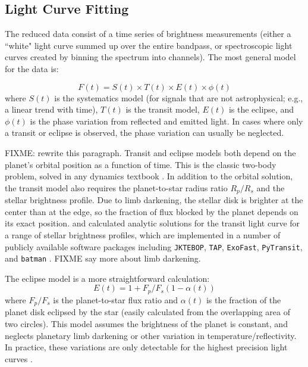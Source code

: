 \documentclass[graybox,natbib,nosecnum]{svmult}
\begin{document}
\subsection{Light Curve Fitting}
The reduced data consist of a time series of brightness measurements (either a ``white" light curve summed up over the entire bandpass, or spectroscopic light curves created by binning the spectrum into channels).  The most general model for the data is:

\begin{equation}
F(t) = S(t) \times T(t) \times E(t) \times \phi(t)
\end{equation}
where $S(t)$ is the systematics model (for signals that are not astrophysical; e.g., a linear trend with time), $T(t)$ is the transit model, $E(t)$ is the eclipse, and $\phi(t)$ is the phase variation from reflected and emitted light. In cases where only a transit or eclipse is observed, the phase variation can usually be neglected.

FIXME: rewrite this paragraph. Transit and eclipse models both depend on the planet's orbital position as a function of time. This is the classic two-body problem, solved in any dynamics textbook \citep[e.g.][]{murray99}. In addition to the orbital solution, the transit model also requires the planet-to-star radius ratio $R_p/R_s$ and the stellar brightness profile. Due to limb darkening, the stellar disk is brighter at the center than at the edge, so the fraction of flux blocked by the planet depends on its exact position.  \cite{mandel02} and \cite{gimenez06} calculated analytic solutions for the transit light curve for a range of stellar brightness profiles,  which are implemented in a number of publicly available software packages including \texttt{JKTEBOP}, \texttt{TAP}, \texttt{ExoFast}, \texttt{PyTransit}, and \texttt{batman} \citep{southworth04, gazak12, eastman13, parviainen15, kreidberg15a}.  FIXME say more about limb darkening.

The eclipse model is a more straightforward calculation: 
\begin{equation}
E(t) = 1 + F_p/F_s (1 - \alpha(t)) 
\end{equation}
where $F_p/F_s$ is the planet-to-star flux ratio and $\alpha(t)$ is the fraction of the planet disk eclipsed by the star (easily calculated from the overlapping area of two circles). This model assumes the brightness of the planet is constant, and neglects planetary limb darkening or other variation in temperature/reflectivity. In practice, these variations are only detectable for the highest precision light curves \citep{FIXME}. 
\end{document}
